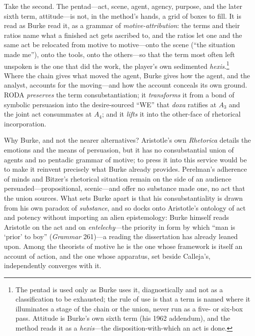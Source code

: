 \documentclass{article}
\begin{document}
Take the second. The pentad---act, scene, agent, agency, purpose, and the later sixth term, attitude---is not, in the method's hands, a grid of boxes to fill. It is read as Burke read it, as a grammar of \textit{motive-attribution}: the terms and their ratios name what a finished act gets ascribed to, and the ratios let one and the same act be relocated from motive to motive---onto the scene (``the situation made me''), onto the tools, onto the others---so that the term most often left unspoken is the one that did the work, the player's own sedimented \textit{hexis}.\footnote{The pentad is used only as Burke uses it, diagnostically and not as a classification to be exhausted; the rule of use is that a term is named where it illuminates a stage of the chain or the union, never run as a five- or six-box pass. Attitude is Burke's own sixth term (his 1962 addendum), and the method reads it as a \textit{hexis}---the disposition-with-which an act is done.} Where the chain gives what moved the agent, Burke gives how the agent, and the analyst, accounts for the moving---and how the account conceals its own ground. RODA \textit{preserves} the term consubstantiation; it \textit{transforms} it from a bond of symbolic persuasion into the desire-sourced ``WE'' that \textit{doxa} ratifies at $A_3$ and the joint act consummates at $A_4$; and it \textit{lifts} it into the other-face of rhetorical incorporation. 

Why Burke, and not the nearer alternatives? Aristotle's own \textit{Rhetorica} details the emotions and the means of persuasion, but it has no consubstantial union of agents and no pentadic grammar of motive; to press it into this service would be to make it reinvent precisely what Burke already provides. Perelman's adherence of minds and Bitzer's rhetorical situation remain on the side of an audience persuaded---propositional, scenic---and offer no substance made one, no act that the union sources. What sets Burke apart is that his consubstantiality is drawn from his own paradox of \textit{substance}, and so docks onto Aristotle's ontology of act and potency without importing an alien epistemology: Burke himself reads Aristotle on the act and on \textit{entelechy}---the priority in form by which ``man is `prior' to boy'' (\textit{Grammar} 261)---a reading the dissertation has already leaned upon. Among the theorists of motive he is the one whose framework is itself an account of action, and the one whose apparatus, set beside Calleja's, independently converges with it.
\end{document}
